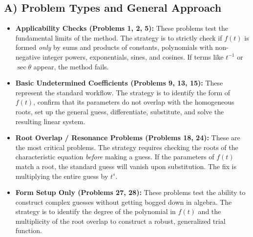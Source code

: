\documentclass[12pt]{article}
\begin{document}
\subsection{A) Problem Types and General Approach}
\begin{itemize}
    \item \textbf{Applicability Checks (Problems 1, 2, 5):} These problems test the fundamental limits of the method. The strategy is to strictly check if $f(t)$ is formed \textit{only} by sums and products of constants, polynomials with non-negative integer powers, exponentials, sines, and cosines. If terms like $t^{-1}$ or $\sec \theta$ appear, the method fails.
    \item \textbf{Basic Undetermined Coefficients (Problems 9, 13, 15):} These represent the standard workflow. The strategy is to identify the form of $f(t)$, confirm that its parameters do not overlap with the homogeneous roots, set up the general guess, differentiate, substitute, and solve the resulting linear system.
    \item \textbf{Root Overlap / Resonance Problems (Problems 18, 24):} These are the most critical problems. The strategy requires checking the roots of the characteristic equation \textit{before} making a guess. If the parameters of $f(t)$ match a root, the standard guess will vanish upon substitution. The fix is multiplying the entire guess by $t^s$.
    \item \textbf{Form Setup Only (Problems 27, 28):} These problems test the ability to construct complex guesses without getting bogged down in algebra. The strategy is to identify the degree of the polynomial in $f(t)$ and the multiplicity of the root overlap to construct a robust, generalized trial function.
\end{itemize}
\end{document}
